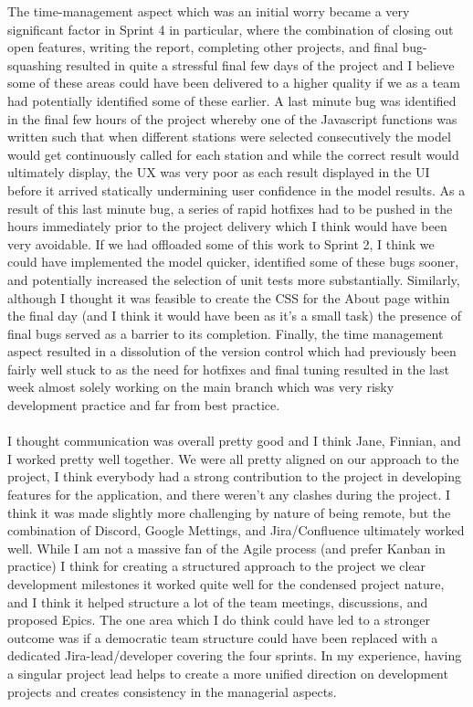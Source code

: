 \documentclass{scrreprt}
\begin{document}
The time-management aspect which was an initial worry became a very significant factor in Sprint 4 in particular, where the combination of closing out open features, writing the report, completing other projects, and final bug-squashing resulted in quite a stressful final few days of the project and I believe some of these areas could have been delivered to a higher quality if we as a team had potentially identified some of these earlier. A last minute bug was identified in the final few hours of the project whereby one of the Javascript functions was written such that when different stations were selected consecutively the model would get continuously called for each station and while the correct result would ultimately display, the UX was very poor as each result displayed in the UI before it arrived statically undermining user confidence in the model results. As a result of this last minute bug, a series of rapid hotfixes had to be pushed in the hours immediately prior to the project delivery which I think would have been very avoidable. If we had offloaded some of this work to Sprint 2, I think we could have implemented the model quicker, identified some of these bugs sooner, and potentially increased the selection of unit tests more substantially. Similarly, although I thought it was feasible to create the CSS for the About page within the final day (and I think it would have been as it's a small task) the presence of final bugs served as a barrier to its completion. Finally, the time management aspect resulted in a dissolution of the version control which had previously been fairly well stuck to as the need for hotfixes and final tuning resulted in the last week almost solely working on the main branch which was very risky development practice and far from best practice.\\
\\
I thought communication was overall pretty good and I think Jane, Finnian, and I worked pretty well together. We were all pretty aligned on our approach to the project, I think everybody had a strong contribution to the project in developing features for the application, and there weren't any clashes during the project. I think it was made slightly more challenging by nature of being remote, but the combination of Discord, Google Mettings, and Jira/Confluence ultimately worked well. While I am not a massive fan of the Agile process (and prefer Kanban in practice) I think for creating a structured approach to the project we clear development milestones it worked quite well for the condensed project nature, and I think it helped structure a lot of the team meetings, discussions, and proposed Epics. The one area which I do think could have led to a stronger outcome was if a democratic team structure could have been replaced with a dedicated Jira-lead/developer covering the four sprints. In my experience, having a singular project lead helps to create a more unified direction on development projects and creates consistency in the managerial aspects. \\
\end{document}
